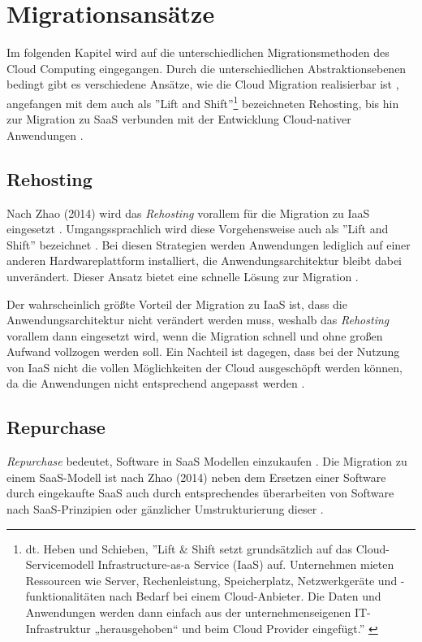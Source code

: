 \section{Migrationsansätze}
\label{sec:migrationsansaetze}

Im folgenden Kapitel wird auf die unterschiedlichen Migrationsmethoden des Cloud Computing eingegangen. Durch die unterschiedlichen Abstraktionsebenen bedingt gibt es verschiedene Ansätze, wie die Cloud Migration realisierbar ist \cite[Vgl.][S. 226]{Surianarayanan2019}, angefangen mit dem auch als ''Lift and Shift''\footnote{dt. Heben und Schieben, ''Lift \& Shift setzt grundsätzlich auf das Cloud-Servicemodell Infrastructure-as-a Service (IaaS) auf. Unternehmen mieten Ressourcen wie Server, Rechenleistung, Speicherplatz, Netzwerkgeräte und -funktionalitäten nach Bedarf bei einem Cloud-Anbieter. Die Daten und Anwendungen werden dann einfach aus der unternehmenseigenen IT-Infrastruktur „herausgehoben“ und beim Cloud Provider eingefügt.'' \cite[][]{Howen2020}} bezeichneten Rehosting, bis hin zur Migration zu \ac{SaaS} verbunden mit der Entwicklung Cloud-nativer Anwendungen \cite[Vgl.][S. 144]{Zhao2014}.

\subsection{Rehosting}
Nach Zhao (2014) wird das \textit{Rehosting} vorallem für die Migration zu \ac{IaaS} eingesetzt \cite[Vgl.][S. 144]{Zhao2014}. Umgangssprachlich wird diese Vorgehensweise auch als ''Lift and Shift'' bezeichnet \cite[Vgl.][]{NetApp}. Bei diesen Strategien werden Anwendungen lediglich auf einer anderen Hardwareplattform installiert, die Anwendungsarchitektur bleibt dabei unverändert. Dieser Ansatz bietet eine schnelle Lösung zur Migration \cite[Vgl.][]{CIO}.


Der wahrscheinlich größte Vorteil der Migration zu \ac{IaaS} ist, dass die Anwendungsarchitektur nicht verändert werden muss, weshalb das \textit{Rehosting} vorallem dann eingesetzt wird, wenn die Migration schnell und ohne großen Aufwand vollzogen werden soll. Ein Nachteil ist dagegen, dass bei der Nutzung von \ac{IaaS} nicht die vollen Möglichkeiten der Cloud ausgeschöpft werden können, da die Anwendungen nicht entsprechend angepasst werden \cite[Vgl.][]{CIO}.

\subsection{Repurchase}
\textit{Repurchase} bedeutet, Software in \ac{SaaS} Modellen einzukaufen \cite[Vgl.][S. 2]{Ahmad2018}. Die Migration zu einem \ac{SaaS}-Modell ist nach Zhao (2014) neben dem Ersetzen einer Software durch eingekaufte \acs{SaaS} auch durch entsprechendes überarbeiten von Software nach \ac{SaaS}-Prinzipien oder gänzlicher Umstrukturierung dieser \cite[Vgl.][S. 144]{Zhao2014}. 

